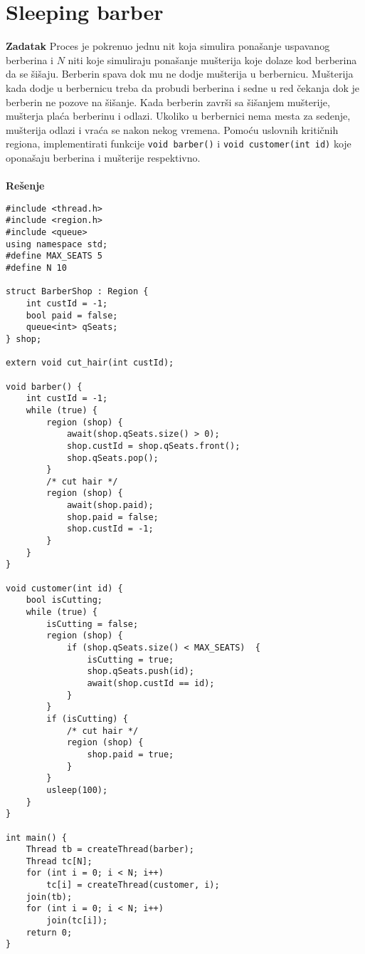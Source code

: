 \clearpage
\section{Sleeping barber}
\textbf{\large Zadatak} Proces je pokrenuo jednu nit koja simulira pona\v{s}anje uspavanog berberina i $N$ niti koje simuliraju pona\v{s}anje mu\v{s}terija koje dolaze kod berberina da se \v{s}i\v{s}aju. Berberin spava dok mu ne dodje mu\v{s}terija u berbernicu. Mu\v{s}terija kada dodje u berbernicu treba da probudi berberina i sedne u red \v{c}ekanja dok je berberin ne pozove na \v{s}i\v{s}anje. Kada berberin zavr\v{s}i sa \v{s}i\v{s}anjem mu\v{s}terije, mu\v{s}terja pla\'{c}a berberinu i odlazi. Ukoliko u berbernici nema mesta za sedenje, mu\v{s}terija odlazi i vra\'{c}a se nakon nekog vremena. Pomo\'{c}u uslovnih kriti\v{c}nih regiona, implementirati funkcije \texttt{void barber()} i \texttt{void customer(int id)} koje opona\v{s}aju berberina i mu\v{s}terije respektivno.
\\\\
\textbf{\large Re\v{s}enje}
\begin{lstlisting}
#include <thread.h>
#include <region.h>
#include <queue>
using namespace std;
#define MAX_SEATS 5
#define N 10

struct BarberShop : Region {
    int custId = -1;
    bool paid = false;
    queue<int> qSeats;
} shop;

extern void cut_hair(int custId);

void barber() {
    int custId = -1;
    while (true) {
        region (shop) {
            await(shop.qSeats.size() > 0);
            shop.custId = shop.qSeats.front();
            shop.qSeats.pop();
        }
        /* cut hair */
        region (shop) {
            await(shop.paid);
            shop.paid = false;
            shop.custId = -1;
        }
    }
}

void customer(int id) {
    bool isCutting;
    while (true) {
        isCutting = false;
        region (shop) {
            if (shop.qSeats.size() < MAX_SEATS)  {
                isCutting = true;
                shop.qSeats.push(id);
                await(shop.custId == id);
            }
        }
        if (isCutting) {
            /* cut hair */
            region (shop) {
                shop.paid = true;
            }
        }
        usleep(100);
    }
}

int main() {
    Thread tb = createThread(barber);
    Thread tc[N];
    for (int i = 0; i < N; i++) 
        tc[i] = createThread(customer, i);
    join(tb);
    for (int i = 0; i < N; i++) 
        join(tc[i]);
    return 0;
}

\end{lstlisting}